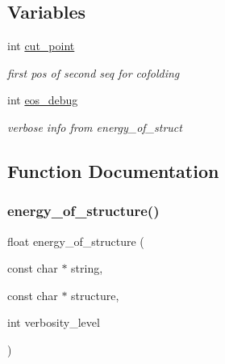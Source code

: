 \subsection*{Variables}
\begin{DoxyCompactItemize}
\item 
\mbox{\label{group__eval__deprecated_gab9b2c3a37a5516614c06d0ab54b97cda}} 
int \mbox{\hyperlink{group__eval__deprecated_gab9b2c3a37a5516614c06d0ab54b97cda}{cut\+\_\+point}}
\begin{DoxyCompactList}\small\item\em first pos of second seq for cofolding \end{DoxyCompactList}\item 
\mbox{\label{group__eval__deprecated_ga567530678f6260a1a649a5beca5da4c5}} 
int \mbox{\hyperlink{group__eval__deprecated_ga567530678f6260a1a649a5beca5da4c5}{eos\+\_\+debug}}
\begin{DoxyCompactList}\small\item\em verbose info from energy\+\_\+of\+\_\+struct \end{DoxyCompactList}\end{DoxyCompactItemize}


\subsection{Function Documentation}
\mbox{\label{group__eval__deprecated_gaf93986cb3cb29770ec9cca69c9fab8cf}} 
\subsubsection{\texorpdfstring{energy\_of\_structure()}{energy\_of\_structure()}}
{\footnotesize\ttfamily float energy\+\_\+of\+\_\+structure (\begin{DoxyParamCaption}\item[{const char $\ast$}]{string,  }\item[{const char $\ast$}]{structure,  }\item[{int}]{verbosity\+\_\+level }\end{DoxyParamCaption})}




